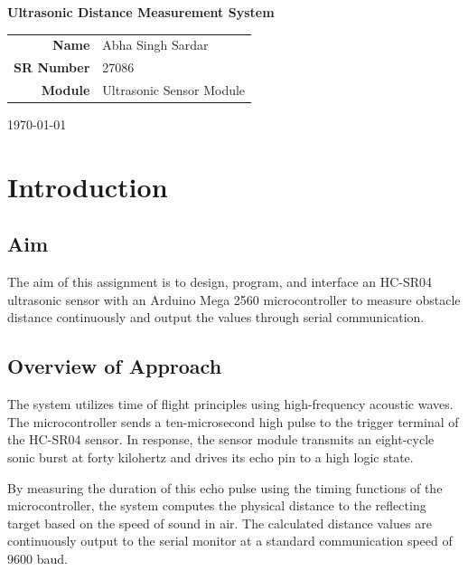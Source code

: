 \documentclass[11pt,a4paper]{article}
\begin{document}
\begin{titlepage}
\centering
\vspace*{3cm}
{\Huge\bfseries Ultrasonic Distance Measurement System \par}
\vspace{2cm}
{\large
\begin{tabular}{rl}
\textbf{Name}      & Abha Singh Sardar  \\[6pt]
\textbf{SR Number} & 27086             \\[6pt]
\textbf{Module}    & Ultrasonic Sensor Module \\[6pt]
\end{tabular}\par}
\vspace{2.5cm}
{\large \today \par}
\vfill
\end{titlepage}

\newpage
{}

\section{Introduction}

\subsection{Aim}
The aim of this assignment is to design, program, and interface an HC-SR04 ultrasonic sensor with an Arduino Mega 2560 microcontroller to measure obstacle distance continuously and output the values through serial communication.

\subsection{Overview of Approach}
The system utilizes time of flight principles using high-frequency acoustic waves. The microcontroller sends a ten-microsecond high pulse to the trigger terminal of the HC-SR04 sensor. In response, the sensor module transmits an eight-cycle sonic burst at forty kilohertz and drives its echo pin to a high logic state.

By measuring the duration of this echo pulse using the timing functions of the microcontroller, the system computes the physical distance to the reflecting target based on the speed of sound in air. The calculated distance values are continuously output to the serial monitor at a standard communication speed of 9600 baud.
\end{document}
